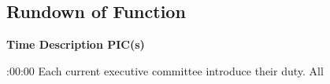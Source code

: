 \subsection{Rundown of Function}

\setupTABLE[c][1][width=1.25in]
\setupTABLE[c][2][width=3.5in]
\setupTABLE[c][3][width=1.25in]
\bTABLE
\bTABLEhead

\bTR\bTH    \bf{Time}
\eTH\bTH    \bf{Description}
\eTH\bTH    \bf{PIC(s)}
\eTH\eTR

\eTABLEhead
\bTABLEbody

\bTR{}:00:00
\eTD\bTD Each current executive committee introduce their duty.
\eTD\bTD All
\eTD\eTR

\eTABLEbody
\eTABLE

\pagebreak
